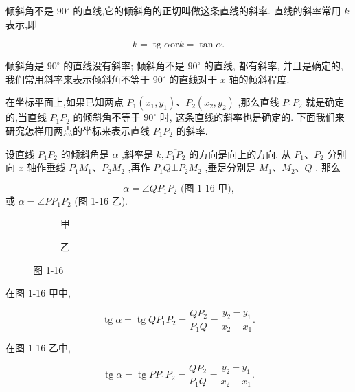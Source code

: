\documentclass[lang=cn,newtx,12pt,scheme=chinese]{elegantbook}
\begin{document}
\begin{definition}[斜率]
  倾斜角不是 \({90}^{ \circ }\) 的直线,它的倾斜角的正切叫做这条直线的斜率. 直线的斜率常用 \(k\) 表示,即

\[
  k = \operatorname{tg}\alpha \text{or} k = \tan\alpha  \text{.}
\]

倾斜角是 \({90}^{ \circ }\) 的直线没有斜率; 倾斜角不是 \({90}^{ \circ }\) 的直线, 都有斜率, 并且是确定的, 我们常用斜率来表示倾斜角不等于 \({90}^{ \circ }\) 的直线对于 \(x\) 轴的倾斜程度.
\end{definition}

在坐标平面上,如果已知两点 \({P}_{1}\left( {{x}_{1},{y}_{1}}\right) \text{、}{P}_{2}\left( {{x}_{2},{y}_{2}}\right)\) ,那么直线 \({P}_{1}{P}_{2}\) 就是确定的,当直线 \({P}_{1}{P}_{2}\) 的倾斜角不等于 \({90}^{ \circ }\) 时, 这条直线的斜率也是确定的. 下面我们来研究怎样用两点的坐标来表示直线 \({P}_{1}{P}_{2}\) 的斜率.

设直线 \({P}_{1}{P}_{2}\) 的倾斜角是 \(\alpha\) ,斜率是 \(k,\overline{{P}_{1}{P}_{2}}\) 的方向是向上的方向. 从 \({P}_{1}\text{、}{P}_{2}\) 分别向 \(x\) 轴作垂线 \({P}_{1}{M}_{1}\text{、}{P}_{2}{M}_{2}\) ,再作 \({P}_{1}Q \bot {P}_{2}{M}_{2}\) ,垂足分别是 \({M}_{1}\text{、}{M}_{2}\text{、}Q\) . 那么

\[
  \alpha = \angle Q{P}_{1}{P}_{2}\text{ (图 1-16 甲),} 
\]
或 \(\alpha = \angle P{P}_{1}{P}_{2}\)  (图 1-16 乙).
\begin{figure}[h]
	\centering
	\begin{subfigure}[h]{0.45\textwidth}
		\centering
		
		\caption{甲}
	\end{subfigure}
	\hfill %
	\begin{subfigure}[h]{0.45\textwidth}
		\centering
		
		\caption{乙}
	\end{subfigure}
	\caption{图 1-16}
\end{figure}

在图 1-16 甲中,

\[
  \operatorname{tg}\alpha = \operatorname{tg}Q{P}_{1}{P}_{2} = \frac{Q{P}_{2}}{{P}_{1}Q} = \frac{{y}_{2} - {y}_{1}}{{x}_{2} - {x}_{1}}.
\]

在图 1-16 乙中,

\[
  \operatorname{tg}\alpha = \operatorname{tg}P{P}_{1}{P}_{2} = \frac{Q{P}_{2}}{{P}_{1}Q} = \frac{{y}_{2} - {y}_{1}}{{x}_{2} - {x}_{1}}.
\]
\end{document}
